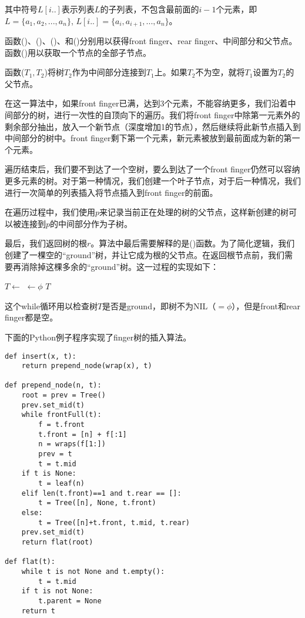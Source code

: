 \documentclass[UTF8]{article}
\begin{document}
其中符号$L[i..]$表示列表$L$的子列表，不包含最前面的$i-1$个元素，即$L = \{a_1, a_2, ..., a_n\}$, $L[i..] = \{a_i, a_{i+1}, ..., a_n\}$。

函数()、()、()、和()分别用以获得front finger、rear finger、中间部分和父节点。函数()用以获取一个节点的全部子节点。

函数($T_1, T_2$)将树$T_2$作为中间部分连接到$T_1$上。如果$T_2$不为空，就将$T_1$设置为$T_2$的父节点。

在这一算法中，如果front finger已满，达到3个元素，不能容纳更多，我们沿着中间部分的树，进行一次性的自顶向下的遍历。我们将front finger中除第一元素外的剩余部分抽出，放入一个新节点（深度增加1的节点），然后继续将此新节点插入到中间部分的树中。front finger剩下第一个元素，新元素被放到最前面成为新的第一个元素。

遍历结束后，我们要不到达了一个空树，要么到达了一个front finger仍然可以容纳更多元素的树。对于第一种情况，我们创建一个叶子节点，对于后一种情况，我们进行一次简单的列表插入将节点插入到front finger的前面。

在遍历过程中，我们使用$p$来记录当前正在处理的树的父节点，这样新创建的树可以被连接到$p$的中间部分作为子树。

最后，我们返回树的根$r$。算法中最后需要解释的是()函数。为了简化逻辑，我们创建了一棵空的“ground”树，并让它成为根的父节点。在返回根节点前，我们需要再消除掉这棵多余的“ground”树。这一过程的实现如下：

\begin{algorithmic}
    \State $T \gets$ 
  \EndWhile
    \State {} $\gets \phi$
  \EndIf
  \State \Return $T$
\EndFunction
\end{algorithmic}

这个while循环用以检查树$T$是否是ground，即树不为NIL（$=\phi$），但是front和rear finger都是空。

下面的Python例子程序实现了finger树的插入算法。

\lstset{language=Python}
\begin{lstlisting}
def insert(x, t):
    return prepend_node(wrap(x), t)

def prepend_node(n, t):
    root = prev = Tree()
    prev.set_mid(t)
    while frontFull(t):
        f = t.front
        t.front = [n] + f[:1]
        n = wraps(f[1:])
        prev = t
        t = t.mid
    if t is None:
        t = leaf(n)
    elif len(t.front)==1 and t.rear == []:
        t = Tree([n], None, t.front)
    else:
        t = Tree([n]+t.front, t.mid, t.rear)
    prev.set_mid(t)
    return flat(root)

def flat(t):
    while t is not None and t.empty():
        t = t.mid
    if t is not None:
        t.parent = None
    return t
\end{lstlisting}
\end{document}
